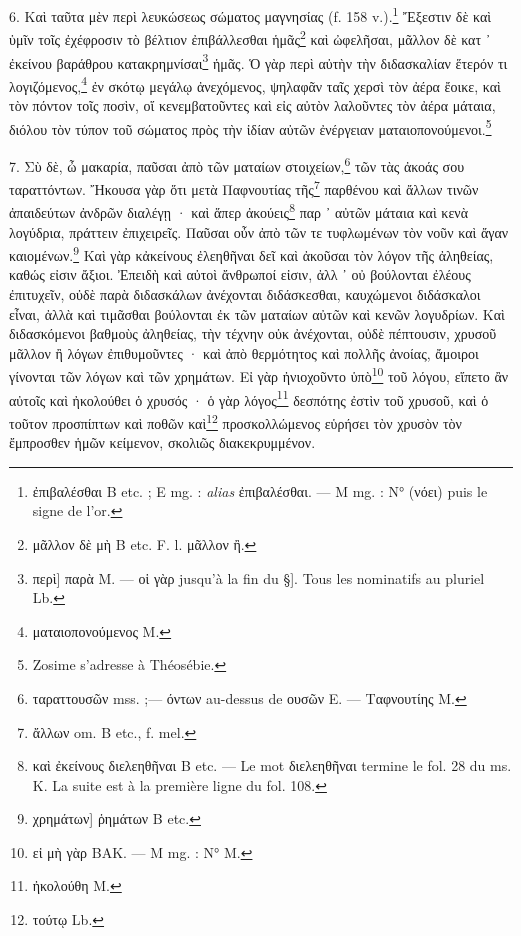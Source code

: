 \documentclass[a4paper, 11pt, oneside, polutonikogreek, french]{article}
\begin{document}
6. Καὶ ταῦτα μὲν περὶ λευκώσεως σώματος μαγνησίας (f. 158 v.).\footnote{ἐπιβαλέσθαι B etc. ; E mg. : \emph{alias} ἐπιβαλέσθαι. --- M mg. : N° (νόει) puis le signe de l'or.} Ἔξεστιν δὲ καὶ ὑμῖν τοῖς ἐχέφροσιν τὸ βέλτιον ἐπιβάλλεσθαι ἡμᾶς\footnote{μᾶλλον δὲ μὴ B etc. F. l. μᾶλλον ἢ.} καὶ ὠφελῆσαι, μᾶλλον δὲ κατ ᾽ ἐκείνου βαράθρου κατακρημνίσαι\footnote{περὶ] παρὰ M. --- οἱ γὰρ jusqu'à la fin du §]. Tous les nominatifs au pluriel Lb.} ἡμᾶς. Ὁ γὰρ περὶ αὐτὴν τὴν διδασκαλίαν ἕτερόν τι λογιζόμενος,\footnote{ματαιοπονούμενος M.} ἐν σκότῳ μεγάλῳ ἀνεχόμενος, ψηλαφᾶν ταῖς χερσὶ τὸν ἀέρα ἔοικε, καὶ τὸν πόντον τοῖς ποσὶν, οἵ κενεμβατοῦντες καὶ εἰς αὐτὸν λαλοῦντες τὸν ἀέρα μάταια, διόλου τὸν τύπον τοῦ σώματος πρὸς τὴν ἰδίαν αὐτῶν ἐνέργειαν ματαιοπονούμενοι.\footnote{Zosime s'adresse à Théosébie.}

7. Σὺ δὲ, ὦ μακαρία, παῦσαι ἀπὸ τῶν ματαίων στοιχείων,\footnote{ταραττουσῶν mss. ;--- όντων au-dessus de ουσῶν E. --- Ταφνουτίης M.} τῶν τὰς ἀκοάς σου ταραττόντων. Ἤκουσα γὰρ ὅτι μετὰ Παφνουτίας τῆς\footnote{ἄλλων om. B etc., f. mel.} παρθένου καὶ ἄλλων τινῶν ἀπαιδεύτων ἀνδρῶν διαλέγῃ · καὶ ἅπερ ἀκούεις\footnote{καὶ ἐκείνους διελεηθῆναι B etc. --- Le mot διελεηθῆναι termine le fol. 28 du ms. K. La suite est à la première ligne du fol. 108.} παρ ᾽ αὐτῶν μάταια καὶ κενὰ λογύδρια, πράττειν ἐπιχειρεῖς. Παῦσαι οὖν ἀπὸ τῶν τε τυφλωμένων τὸν νοῦν καὶ ἄγαν καιομένων.\footnote{χρημάτων] ῥημάτων B etc.} Καὶ γὰρ κἀκείνους ἐλεηθῆναι δεῖ καὶ ἀκοῦσαι τὸν λόγον τῆς ἀληθείας, καθώς εἰσιν ἄξιοι. Ἐπειδὴ καὶ αὐτοὶ ἄνθρωποί εἰσιν, ἀλλ ᾽ οὐ βούλονται ἐλέους ἐπιτυχεῖν, οὐδὲ παρὰ διδασκάλων ἀνέχονται διδάσκεσθαι, καυχώμενοι διδάσκαλοι εἶναι, ἀλλὰ καὶ τιμᾶσθαι βούλονται ἐκ τῶν ματαίων αὐτῶν καὶ κενῶν λογυδρίων. Καὶ διδασκόμενοι βαθμοὺς ἀληθείας, τὴν τέχνην οὐκ ἀνέχονται, οὐδὲ πέπτουσιν, χρυσοῦ μᾶλλον ἢ λόγων ἐπιθυμοῦντες · καὶ ἀπὸ θερμότητος καὶ πολλῆς ἀνοίας, ἄμοιροι γίνονται τῶν λόγων καὶ τῶν χρημάτων. Εἰ γὰρ ἠνιοχοῦντο ὑπὸ\footnote{εἰ μὴ γὰρ BAK. --- M mg. : N° M.} τοῦ λόγου, εἵπετο ἂν αὐτοῖς καὶ ἠκολούθει ὁ χρυσός · ὁ γὰρ λόγος\footnote{ἠκολούθη M.} δεσπότης ἐστὶν τοῦ χρυσοῦ, καὶ ὁ τοῦτον προσπίπτων καὶ ποθῶν καὶ\footnote{τούτῳ Lb.} προσκολλώμενος εὑρήσει τὸν χρυσὸν τὸν ἔμπροσθεν ἡμῶν κείμενον, σκολιῶς διακεκρυμμένον.
\end{document}
